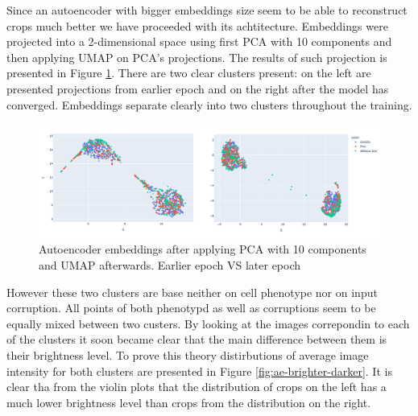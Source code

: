 Since an autoencoder with bigger embeddings size seem to be able to reconstruct crops much better we have proceeded with its achtitecture. Embeddings were projected into a 2-dimensional space using first PCA with 10 components and then applying UMAP on PCA's projections. The results of such projection is presented in Figure \ref{fig:ae-pca-umap-clustered}. There are two clear clusters present: on the left are presented projections from earlier epoch and on the right after the model has converged. Embeddings separate clearly into two clusters throughout the training.

\begin{figure}[htb]
	\begin{center}
		\includegraphics[width=0.8\linewidth]{bilder/ae-embeddings/pca-umap-clusters.png}
		\caption{Autoencoder embeddings after applying PCA with 10 components and UMAP afterwards. Earlier epoch VS later epoch}\label{fig:ae-pca-umap-clustered}
	\end{center}
\end{figure}

However these two clusters are base neither on cell phenotype nor on input corruption. All points of both phenotypd as well as corruptions seem to be equally mixed between two custers. By looking at the images correpondin to each of the clusters it soon became clear that the main difference between them is their brightness level. To prove this theory distirbutions of average image intensity for both clusters are presented in Figure \ref{fig:ae-brighter-darker}. It is clear tha from the violin plots that the distribution of crops on the left has a much lower brightness level than crops from the distribution on the right.


